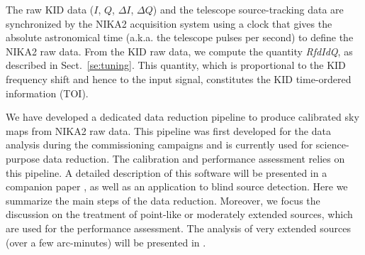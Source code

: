 

The raw KID data ($I$, $Q$, $\Delta I$, $\Delta Q$) and the telescope
source-tracking data are synchronized by the NIKA2 acquisition system using a
clock that gives the absolute astronomical time (a.k.a. the telescope
pulses per second) to define the NIKA2 raw data. From the KID raw
data, we compute the quantity \emph{RfdIdQ}, as described in
Sect.~\ref{se:tuning}. This quantity, which is proportional to the KID
frequency shift and hence to the input signal, constitutes the
KID time-ordered information (TOI).


We have developed a dedicated data reduction pipeline to
produce calibrated sky maps from NIKA2 raw data. This pipeline was first 
developed for the data analysis during the commissioning campaigns and
is currently used for science-purpose data reduction. The calibration
and performance assessment relies on this pipeline. 
A detailed description of this software will be presented in a companion
paper \citep{Ponthieu2019}, as well as an application to blind source
detection. Here we summarize the main steps of the data
reduction. {\lp Moreover, we focus the discussion on the treatment of
point-like or moderately extended sources, which are used for the
performance assessment. The analysis of very extended sources (over a few
arc-minutes) will be presented in \citet{Ponthieu2019}.}

